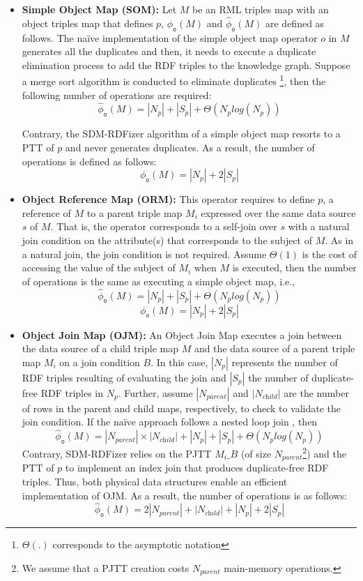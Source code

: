 \begin{itemize}
    \item \textbf{Simple Object Map (SOM):}
    Let $M$ be an RML triples map with an object triples map that defines $p$, $\phi_{\texttt{o}}(M)$ and $\widehat{\phi}_{\texttt{o}}(M)$ are defined as follows.  
  The na\"ive implementation of the simple object map operator $o$ in $M$ generates all the duplicates and then, it needs to execute a duplicate elimination process to add the RDF triples to the knowledge graph. Suppose a merge sort algorithm is conducted to eliminate duplicates \citep{BittonD83}\footnote{$\Theta(.)$ corresponds to the asymptotic notation}, then the following number of operations are required: 
       \[\widehat{\phi}_{\texttt{o}}(M)=
        |N_{p}| + |S_{p}| + \Theta(N_{p}log(N_{p}))\]
       
Contrary, the SDM-RDFizer algorithm of a simple object map resorts to a PTT of $p$ and never generates duplicates. As a result, the number of operations is defined as follows:
       \[ \phi_{\texttt{o}}(M)=|N_{p}| + 2|S_{p}|\]
       
    \item \textbf{Object Reference Map (ORM):} 
    This operator requires to define $p$, a reference of $M$ to a parent triple map $M_i$ expressed over the same data source $s$ of $M$. That is, the operator corresponds to a self-join over $s$ with a natural join condition on the attribute(s) that corresponds to the subject of $M$. As in a natural join, the join condition is not required. Assume $\Theta(1)$ is the cost of accessing the value of the subject of $M_i$ when $M$ is executed, then the number of operations is the same as executing a simple object map, i.e., 
    \[\widehat{\phi}_{\texttt{o}}(M)=
        |N_{p}| + |S_{p}| + \Theta(N_{p}log(N_{p}))\]
    \[ \phi_{\texttt{o}}(M)=|N_{p}| + 2|S_{p}|\]    
    \item \textbf{Object Join Map (OJM):}
    An Object Join Map executes a join between the data source of a child triple map $M$ and the data source of a parent triple map $M_i$ on a join condition $B$. In this case, $|N_p|$ represents the number of RDF triples resulting of evaluating the join and $|S_p|$ the number of duplicate-free RDF triples in $N_p$. Further, assume $|N_{\textit{parent}}|$ and $|N_{\textit{child}}|$ are the number of rows in the parent and child maps, respectively, to check to validate the join condition. If the na\"ive approach follows a nested loop join \citep{SteinbrunnMK97}, then 
    \[\widehat{\phi}_{\texttt{o}}(M)= |N_{\textit{parent}}| \times |N_{\textit{child}}| +
        |N_{p}| + |S_{p}| + \Theta(N_{p}log(N_{p}))\]
 Contrary, SDM-RDFizer relies on the PJTT $M_i \_B$ (of size $N_{\textit{parent}}$\footnote{We assume that a PJTT creation costs $N_{\textit{parent}}$ main-memory operations.}) and the PTT of $p$ to implement an index join that produces duplicate-free RDF triples. Thus, both physical data structures enable an efficient implementation of OJM. As a result, the number of operations is as follows:
 \[\widehat{\phi}_{\texttt{o}}(M)= 2|N_{\textit{parent}}| + |N_{\textit{child}}| +
        |N_{p}| + 2|S_{p}|\]
\end{itemize}
